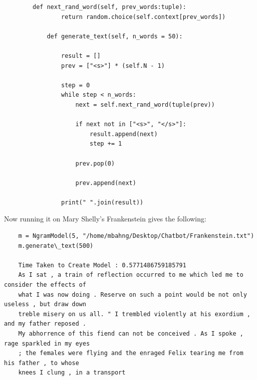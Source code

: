 \documentclass{article}
\begin{document}
    \begin{lstlisting}
        def next_rand_word(self, prev_words:tuple): 
                return random.choice(self.context[prev_words])
            
            def generate_text(self, n_words = 50): 
                
                result = []
                prev = ["<s>"] * (self.N - 1)
                
                step = 0
                while step < n_words: 
                    next = self.next_rand_word(tuple(prev)) 
                    
                    if next not in ["<s>", "</s>"]: 
                        result.append(next) 
                        step += 1
                    
                    prev.pop(0) 
                    
                    prev.append(next)
        
                print(" ".join(result))
    \end{lstlisting}
    Now running it on Mary Shelly's Frankenstein gives the following: 
    \begin{lstlisting}
    m = NgramModel(5, "/home/mbahng/Desktop/Chatbot/Frankenstein.txt")    
    m.generate\_text(500)

    Time Taken to Create Model : 0.5771486759185791
    As I sat , a train of reflection occurred to me which led me to consider the effects of 
    what I was now doing . Reserve on such a point would be not only useless , but draw down 
    treble misery on us all. " I trembled violently at his exordium , and my father reposed .
    My abhorrence of this fiend can not be conceived . As I spoke , rage sparkled in my eyes 
    ; the females were flying and the enraged Felix tearing me from his father , to whose 
    knees I clung , in a transport
    \end{lstlisting}
\end{document}
